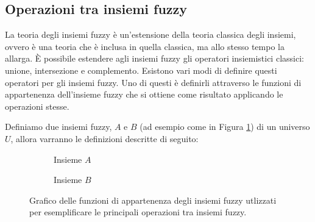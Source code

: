 \documentclass[a4paper,12pt]{report}
\begin{document}
\subsection*{Operazioni tra insiemi fuzzy}
La teoria degli insiemi fuzzy è un'estensione della teoria classica degli insiemi, ovvero è una teoria che è inclusa in quella classica, ma allo stesso tempo la allarga.
\`E possibile estendere agli insiemi fuzzy gli operatori insiemistici classici: unione, intersezione e complemento. Esistono vari modi di definire questi operatori per gli insiemi fuzzy. Uno di questi è definirli attraverso le funzioni di appartenenza dell'insieme fuzzy che si ottiene come risultato applicando le operazioni stesse.

\bigskip
Definiamo due insiemi fuzzy, $A$ e $B$ (ad esempio come in Figura \ref{fig:Insiemi Fuzzy}) di un universo $U$, allora varranno le definizioni descritte di seguito:

\begin{figure}[h]
    \begin{subfigure}[t]{0.47\textwidth}
        \centering
        \caption{Insieme $A$}
    \end{subfigure}
    \begin{subfigure}[t]{0.47\textwidth}
        \centering
        \caption{Insieme $B$}
    \end{subfigure}
    \caption{Grafico delle funzioni di appartenenza degli insiemi fuzzy utlizzati per esemplificare le principali operazioni tra insiemi fuzzy.}
    \label{fig:Insiemi Fuzzy}
\end{figure}
\end{document}
